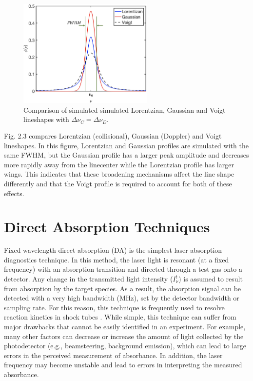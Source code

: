 \begin{figure}[b]
    \centering
        \includegraphics[width=0.6\textwidth]{fig/ch2_fig4.png}
        \caption{Comparison of simulated simulated Lorentzian, Gaussian and Voigt lineshapes with $\Delta\nu_C=\Delta\nu_D$.}
    \label{fig:ch2_3}
\end{figure}

Fig. 2.3 compares Lorentzian (collisional), Gaussian (Doppler) and Voigt lineshapes. In this figure, Lorentzian and Gaussian profiles are simulated with the same FWHM, but the Gaussian profile has a larger peak amplitude and decreases more rapidly away from the linecenter while the Lorentzian profile has larger wings. This indicates that these broadening mechanisms affect the line shape differently and that the Voigt profile is required to account for both of these effects.


\section{Direct Absorption Techniques}
Fixed-wavelength direct absorption (DA) is the simplest laser-absorption diagnostics technique. In this method, the laser light is resonant (at a fixed frequency) with an absorption transition and directed through a test gas onto a detector. Any change in the transmitted light intensity ($I_\nu^t$) is assumed to result from absorption by the target species. As a result, the absorption signal can be detected with a very high bandwidth (MHz), set by the detector bandwidth or sampling rate. For this reason, this technique is frequently used to resolve reaction kinetics in shock tubes \cite{HANSON2014103}. While simple, this technique can suffer from major drawbacks that cannot be easily identified in an experiment. For example, many other factors can decrease or increase the amount of light collected by the photodetector (e.g., beamsteering, background emission), which can lead to large errors in the perceived measurement of absorbance. In addition, the laser frequency may become unstable and lead to errors in interpreting the measured absorbance. 

